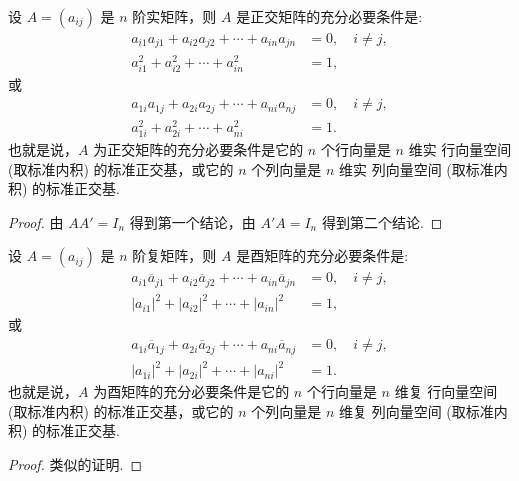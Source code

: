 \documentclass[../../main.tex]{subfiles}%
\begin{document}
\begin{theorem}\label{theorem:正交矩阵的基本性质1}
设 $A = (a_{ij})$ 是 $n$ 阶实矩阵，则 $A$ 是正交矩阵的充分必要条件是:
\begin{align*}
a_{i1}a_{j1} + a_{i2}a_{j2} + \cdots + a_{in}a_{jn} &= 0,\quad i \neq j,\\
a_{i1}^2 + a_{i2}^2 + \cdots + a_{in}^2 &= 1,
\end{align*}
或
\begin{align*}
a_{1i}a_{1j} + a_{2i}a_{2j} + \cdots + a_{ni}a_{nj} &= 0,\quad i \neq j,\\
a_{1i}^2 + a_{2i}^2 + \cdots + a_{ni}^2 &= 1.
\end{align*}
也就是说，$A$ 为正交矩阵的充分必要条件是它的 $n$ 个行向量是 $n$ 维实 行向量空间 (取标准内积) 的标准正交基，或它的 $n$ 个列向量是 $n$ 维实 列向量空间 (取标准内积) 的标准正交基.
\end{theorem}
\begin{proof}

由 $AA' = I_n$ 得到第一个结论，由 $A'A = I_n$ 得到第二个结论.

\end{proof}

\begin{theorem}\label{theorem:酉矩阵的基本性质1}
设 $A = (a_{ij})$ 是 $n$ 阶复矩阵，则 $A$ 是酉矩阵的充分必要条件是:
\begin{align*}
a_{i1}\overline{a}_{j1} + a_{i2}\overline{a}_{j2} + \cdots + a_{in}\overline{a}_{jn} &= 0,\quad i \neq j,\\
|a_{i1}|^2 + |a_{i2}|^2 + \cdots + |a_{in}|^2 &= 1,
\end{align*}
或
\begin{align*}
a_{1i}\overline{a}_{1j} + a_{2i}\overline{a}_{2j} + \cdots + a_{ni}\overline{a}_{nj} &= 0,\quad i \neq j,\\
|a_{1i}|^2 + |a_{2i}|^2 + \cdots + |a_{ni}|^2 &= 1.
\end{align*}
也就是说，$A$ 为酉矩阵的充分必要条件是它的 $n$ 个行向量是 $n$ 维复 行向量空间 (取标准内积) 的标准正交基，或它的 $n$ 个列向量是 $n$ 维复 列向量空间 (取标准内积) 的标准正交基.
\end{theorem}
\begin{proof}

类似的证明.

\end{proof}
\end{document}

